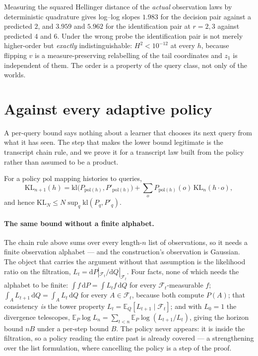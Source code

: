 Measuring the squared Hellinger distance of the \emph{actual} observation laws by
deterministic quadrature gives log--log slopes $1.983$ for the decision pair against a
predicted $2$, and $3.959$ and $5.962$ for the identification pair at $r=2,3$ against
predicted $4$ and $6$. \NUM{} Under the wrong probe the identification pair is not merely
higher-order but \emph{exactly} indistinguishable: $H^{2}<10^{-12}$ at every $h$, because
flipping $v$ is a measure-preserving relabelling of the tail coordinates and $z_{1}$ is
independent of them. The order is a property of the query class, not only of the worlds.

\section{Against every adaptive policy}
\label{sec:adaptive}

A per-query bound says nothing about a learner that chooses its next query from what it has
seen. The step that makes the lower bound legitimate is the transcript chain rule, and we
prove it for a transcript law built from the policy rather than assumed to be a product.

\begin{theorem}
\label{thm:chain}
For a policy $\mathrm{pol}$ mapping histories to queries,
\begin{equation}
\mathrm{KL}_{n+1}(h)=\mathrm{kl}\bigl(P_{\mathrm{pol}(h)},P'_{\mathrm{pol}(h)}\bigr)
+\sum_{o}P_{\mathrm{pol}(h)}(o)\,\mathrm{KL}_{n}(h\!\cdot\!o),
\label{eq:chain}
\end{equation}
and hence $\mathrm{KL}_{N}\le N\sup_{q}\mathrm{kl}(P_{q},P'_{q})$.
\end{theorem}


\paragraph{The same bound without a finite alphabet.}
The chain rule above sums over every length-$n$ list of observations, so it needs a finite
observation alphabet --- and the construction's observation is Gaussian. The object that
carries the argument without that assumption is the likelihood ratio on the filtration,
$L_{t}=\mathrm{d}P|_{\mathcal F_{t}}/\mathrm{d}Q|_{\mathcal F_{t}}$. Four facts, none of which
needs the alphabet to be finite: $\int f\,\mathrm{d}P=\int L_{t}f\,\mathrm{d}Q$ for every
$\mathcal F_{t}$-measurable $f$; $\int_{A}L_{t+1}\,\mathrm{d}Q=\int_{A}L_{t}\,\mathrm{d}Q$ for
every $A\in\mathcal F_{t}$, because both compute $P(A)$; that consistency \emph{is} the tower
property $L_{t}=\mathbb{E}_{Q}[L_{t+1}\mid\mathcal F_{t}]$; and with $L_{0}=1$ the divergence
telescopes, $\mathbb{E}_{P}\log L_{n}=\sum_{t<n}\mathbb{E}_{P}\log(L_{t+1}/L_{t})$, giving the
horizon bound $nB$ under a per-step bound $B$. The policy never appears: it is inside the
filtration, so a policy reading the entire past is already covered --- a strengthening over
the list formulation, where cancelling the policy is a step of the proof.

